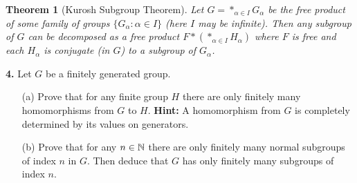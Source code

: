 \documentclass[12pt]{amsart}
\newtheorem* {Theorem}    {Theorem}
\begin{document}
\begin{Theorem}[Kurosh Subgroup Theorem] Let $G=\ast_{\alpha\in I} G_{\alpha}$ be the free product of some
family of groups $\{G_{\alpha}: \alpha\in I\}$ (here $I$ may be infinite). Then any subgroup of
$G$ can be decomposed as a free product $F\ast(\ast_{\alpha\in I} H_{\alpha})$ where $F$ is free and
each $H_{\alpha}$ is conjugate (in $G$) to a subgroup of $G_{\alpha}$.
\end{Theorem}


{\bf 4.} %
Let $G$ be a finitely generated group.
\begin{itemize}
\item[(a)] Prove that for any finite group $H$ there are only finitely many homomorphisms 
from $G$ to $H$. {\bf Hint:} A homomorphism from $G$ is completely determined by its values 
on generators.
\item[(b)] Prove that for any $n\in{\mathbb N}$ there are only finitely many normal subgroups 
of index $n$ in $G$. Then deduce that $G$ has only finitely many subgroups of index $n$.
\end{itemize}
\end{document}
